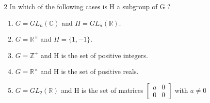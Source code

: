 \documentclass{article}
\newcommand{\C}{\mathbb{C}}
\newcommand{\R}{\mathbb{R}}
\newcommand{\Z}{\mathbb{Z}}
\begin{document}
\begin{PROB}{2}\label{Problem 2.}
    In which of the following cases is H a subgroup of G ?

    \begin{enumerate}
        \item $G = GL_n(\C)$ and $H = GL_n(\R)$.
        \item $G = \R^\times$ and $H=\{1,-1\}$.
        \item $G = \Z^+$ and H is the set of positive integers.
        \item $G = \R^\times$ and H is the set of positive reals.
        \item $G = GL_2(\R)$ and H is the set of matrices $\begin{bmatrix}{}
            a & 0\\
            0 & 0
        \end{bmatrix}$ with $a \neq 0$
    \end{enumerate}
\end{PROB}
\end{document}
